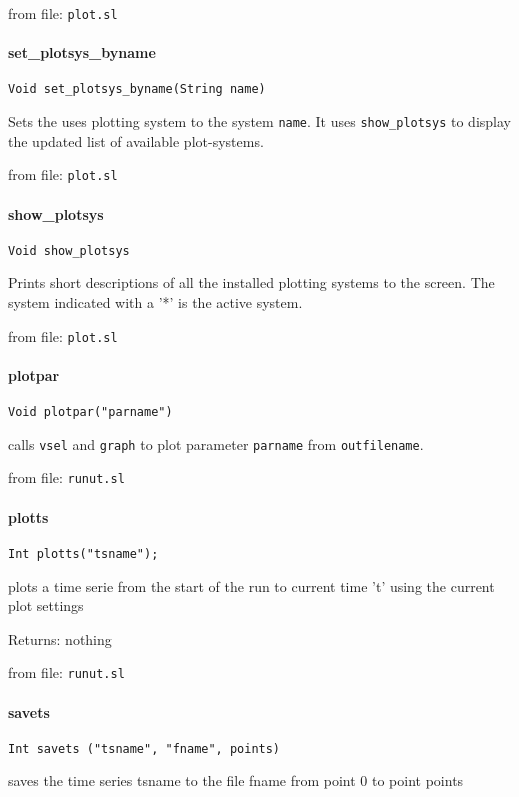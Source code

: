 from file: {\tt plot.sl}


\paragraph{set\_plotsys\_byname}
\begin{verbatim}
Void set_plotsys_byname(String name)
\end{verbatim}
Sets the uses plotting system to the system {\tt name}. It uses {\tt show\_plotsys}
to display the updated list of available plot-systems.

from file: {\tt plot.sl}


\paragraph{show\_plotsys}
\begin{verbatim}
Void show_plotsys
\end{verbatim}
Prints short descriptions of all the installed plotting systems
to the screen. The system indicated with a '*' is the active system.

from file: {\tt plot.sl}


\paragraph{plotpar}
\begin{verbatim}
Void plotpar("parname")
\end{verbatim}
calls {\tt vsel} and {\tt graph} to plot parameter {\tt parname} from {\tt outfilename}.

from file: {\tt runut.sl}


\paragraph{plotts}
\begin{verbatim}
Int plotts("tsname");
\end{verbatim}
plots a time serie from the start of the run to
current time 't' using the current plot settings


Returns: nothing

from file: {\tt runut.sl}


\paragraph{savets}
\begin{verbatim}
Int savets ("tsname", "fname", points)
\end{verbatim}
saves the time series tsname to the file fname from
point 0 to point points


